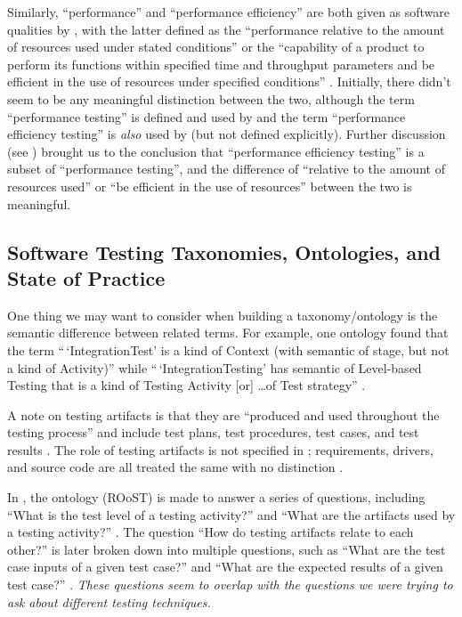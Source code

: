Similarly, ``performance'' and ``performance efficiency'' are
both given as software qualities by \citeauthor{IEEE2017}, with the latter
defined as the ``performance relative to the amount
of resources used under stated conditions'' \citeyearpar[p.~319]{IEEE2017}
or the ``capability of a product to perform its functions within specified
time and throughput parameters and be efficient in the use of resources under
specified conditions'' \citep{ISO_IEC2023a}.
Initially, there didn't seem to be any meaningful distinction
between the two, although the term ``performance testing'' is defined
\citeyearpar[p.~320]{IEEE2017} and used by \citeauthor{IEEE2017} and
the term ``performance efficiency testing'' is \emph{also} used by
\citeauthor{IEEE2017} (but not defined explicitly). Further discussion (see
) brought us to the conclusion that ``performance
efficiency testing'' is a subset of ``performance testing'', and the
difference of ``relative to the amount of resources used'' or ``be efficient in
the use of resources'' between the two is meaningful.

\subsection{Software Testing Taxonomies, Ontologies, and State of Practice}

One thing we may want to consider when building a taxonomy/ontology is the
semantic difference between related terms. For example, one ontology found
that the term ``\,`IntegrationTest' is a kind of Context (with
semantic of stage, but not a kind of Activity)'' while ``\,`IntegrationTesting'
has semantic of Level-based Testing that is a kind of Testing Activity [or]
\dots of Test strategy'' \citep[p.~157]{TebesEtAl2019}.

A note on testing artifacts is that they are ``produced and used throughout
the testing process'' and include test plans, test procedures, test cases, and
test results \citep[p.~3]{SouzaEtAl2017}. The role of testing
artifacts is not specified in \citep{BarbosaEtAl2006};
requirements, drivers, and source code are all treated the same
with no distinction \citep[p.~3]{BarbosaEtAl2006}.

In \citep{SouzaEtAl2017}, the ontology (ROoST)  is made to
answer a series of questions, including ``What is the test level of a testing
activity?'' and ``What are the artifacts used by a testing activity?''
\citep[pp.~8-9]{SouzaEtAl2017}. 
The question ``How do testing artifacts relate to each other?''
\citep[p.~8]{SouzaEtAl2017} is later broken down into multiple questions,
such as ``What are the test case inputs of a given test case?'' and ``What are
the expected results of a given test case?'' \citep[p.~21]{SouzaEtAl2017}.
\emph{These questions seem to overlap with the questions we were trying to ask
      about different testing techniques.}


